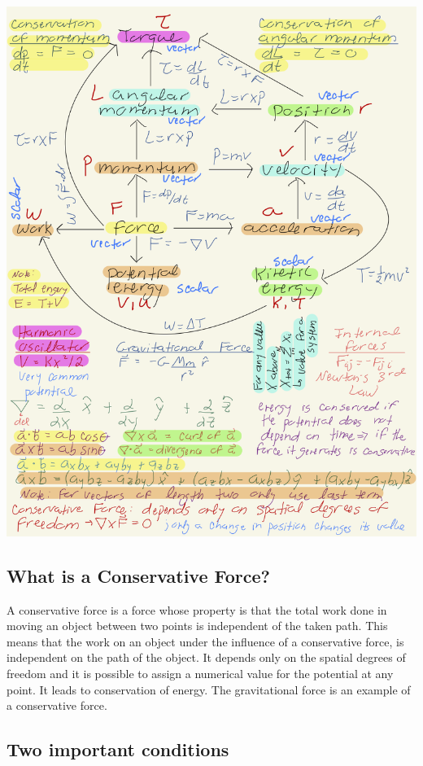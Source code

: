 \documentclass[%
oneside,                 %
final,                   %
10pt]{article}
\begin{document}
\vspace{6mm}

\centerline{\includegraphics[width=0.8\linewidth]{figslides/ClassicalMechanicsJulie.png}}

\vspace{6mm}

\subsection{What is a Conservative Force?}

A conservative force is a force whose property is that the total work
done in moving an object between two points is independent of the
taken path. This means that the work on an object under the influence
of a conservative force, is independent on the path of the object. It
depends only on the spatial degrees of freedom and it is possible to
assign a numerical value for the potential at any point. It leads to
conservation of energy. The gravitational force is an example of a
conservative force.

\subsection{Two important conditions}
\end{document}
